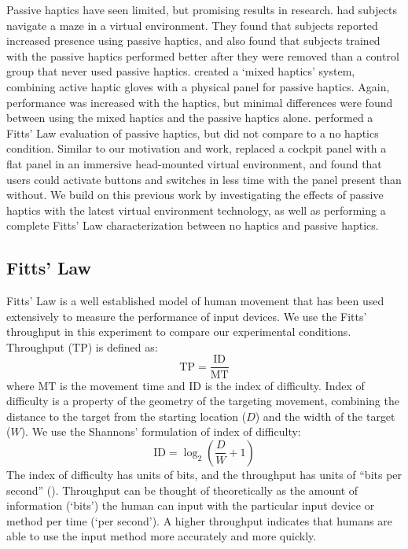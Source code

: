 Passive haptics have seen limited, but promising results in research.
\citet{insko_passive_2001} had subjects navigate a maze in a virtual environment.
They found that subjects reported increased presence using passive haptics, and also found that subjects trained with the passive haptics performed better after they were removed than a control group that never used passive haptics.
\citet{borst_evaluation_2005} created a `mixed haptics' system, combining active haptic gloves with a physical panel for passive haptics.
Again, performance was increased with the haptics, but minimal differences were found between using the mixed haptics and the passive haptics alone.
\citet{kohli_redirected_2012} performed a Fitts' Law evaluation of passive haptics, but did not compare to a no haptics condition.
Similar to our motivation and work, \citet{schiefele_simple_1998} replaced a cockpit panel with a flat panel in an immersive head-mounted virtual environment, and found that users could activate buttons and switches in less time with the panel present than without.
We build on this previous work by investigating the effects of passive haptics with the latest virtual environment technology, as well as performing a complete Fitts' Law characterization between no haptics and passive haptics.

\subsection{Fitts' Law}

Fitts' Law is a well established model of human movement that has been used extensively to measure the performance of input devices.
We use the Fitts' throughput in this experiment to compare our experimental conditions.
Throughput ($\mathrm{TP}$) is defined as:
\begin{equation}
    \mathrm{TP}=\frac{\mathrm{ID}}{\mathrm{MT}}
    \label{eq:throughput}
\end{equation}
where $\mathrm{MT}$ is the movement time and $\mathrm{ID}$ is the index of difficulty.
Index of difficulty is a property of the geometry of the targeting movement, combining the distance to the target from the starting location ($D$) and the width of the target ($W$).
We use the Shannons' formulation of index of difficulty:
\begin{equation}
    \mathrm{ID}=\log_2\left(\frac{D}{W}+1\right)
\end{equation}
The index of difficulty has units of bits, and the throughput has units of ``bits per second'' (\si{\bps}).
Throughput can be thought of theoretically as the amount of information (`bits') the human can input with the particular input device or method per time (`per second').
A higher throughput indicates that humans are able to use the input method more accurately and more quickly.

